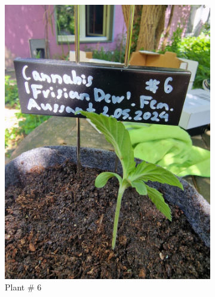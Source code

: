 \begin{figure}[htbp]
\begin{subfigure}[t]{.19\textwidth}
        \includegraphics[width=\linewidth]{plant_06_2024-05-13}
        \caption{Plant \# 6}
        \label{fig:plant_06_2024-05-13}
    \end{subfigure}
    \begin{subfigure}[t]{.19\textwidth}

\end{subfigure}
\end{figure}

